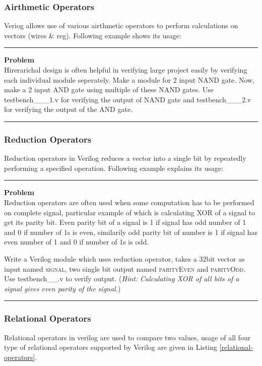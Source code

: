 \documentclass[a4paper,10pt]{article}
\newcommand{\ano}{\text{1}}
\theoremstyle{mytheor}
\newcommand{
  \insertverilog}[3]{
  
}
\newcounter{problemNumber}
\newcommand {
  \insertProblem}[1]{
  \vspace{0.5cm}
  \hrule
  \vspace{0.3cm}

  {\color{greatblue}\textbf{\large{Problem \theproblemNumber}}}
  \vspace{2pt}\\#1

  \addtocounter{problemNumber}{1}
  \vspace{0.2cm}
  \hrule  
  \vspace{0.5cm}
}
\begin{document}
\subsubsection*{Airthmetic Operators}
Veriog allows use of various airthmetic operators to perform
calculations on vectors (wires \& reg). Following example shows its
usage:
\insertverilog{./verilog_files/airthmeticOperators.v}{airthmetic-operators}{\text{Functioning of airthmetic operator}}

\insertProblem{Hirerarichal design is often helpful in verifying large project easily by verifying each individual module seperately. Make a module for 2 input NAND gate. Now, make a 2 input AND gate using multiple of these NAND gates. Use {testbench\_{\ano}\_{\theproblemNumber}\_1.v} for verifying the output of NAND gate and {testbench\_{\ano}\_{\theproblemNumber}\_2.v} for verifying the output of the AND gate.}


\subsubsection*{Reduction Operators}
Reduction operators in Verilog reduces a vector into a single
bit by repeatedly performing a specified operation. Following example 
explains its usage: 
\insertverilog{./verilog_files/reductionOperators.v}{reduction-operators}{\text{Functioning of reduction operator}}

\break
\insertProblem {
  Reduction operators are often used when some computation has to be performed on complete signal, particular example of which is calculating XOR of a signal to get its parity bit. Even parity bit of a signal is 1 if signal has odd number of 1 and 0 if number of 1s is even, similarily odd parity bit of number is 1 if signal has even number of 1 and 0 if number of 1s is odd.

  Write a Verilog module which uses reduction operator, takes a 32bit vector as input named \textsc{signal}, two single bit output named \textsc{parityEven} and \textsc{parityOdd}. Use {testbench\_{\ano}\_{\theproblemNumber}.v} to verify output. (\textit{Hint: Calculating XOR of all bits of a signal gives even parity of the signal.})
}

\subsubsection*{Relational Operators}
Relational operators in verilog are used to compare two values, usage
of all four type of relational operators supported by Verilog are
given in Listing \ref{relational-operators}.
\insertverilog{./verilog_files/relationalOperators.v}{relational-operators}{\text{Functioning of relational operator}}
  
\end{document}
